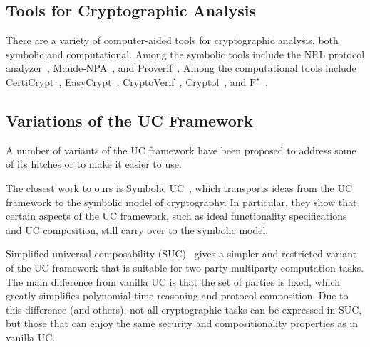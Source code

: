 \subsection{Tools for Cryptographic Analysis}
\label{subsec:tools}

There are a variety of computer-aided tools for cryptographic analysis, both
symbolic and computational. Among the symbolic tools include the NRL protocol
analyzer~\cite{meadows1996nrl}, Maude-NPA~\cite{escobar2009maude}, and
Proverif~\cite{blanchet2010proverif}. Among the computational tools include
CertiCrypt~\cite{barthe2009formal}, EasyCrypt~\cite{barthe2011computer},
CryptoVerif~\cite{blanchet2007cryptoverif}, Cryptol~\cite{lewis2003cryptol}, and
$\text{F}^{\star}$~\cite{swamy2016dependent}.


\subsection{Variations of the UC Framework}
\label{subsec:uc-variants}

A number of variants of the UC framework have been proposed to address some of
its hitches or to make it easier to use.

The closest work to ours is Symbolic UC~\cite{bohl2016symbolic}, which
transports ideas from the UC framework to the symbolic model of cryptography. In
particular, they show that certain aspects of the UC framework, such as ideal
functionality specifications and UC composition, still carry over to the
symbolic model.

Simplified universal composability (SUC)~\cite{canetti2015simpler} gives a
simpler and restricted variant of the UC framework that is suitable for
two-party multiparty computation tasks. The main difference from vanilla UC is
that the set of parties is fixed, which greatly simplifies polynomial time
reasoning and protocol composition. Due to this difference (and others), not all
cryptographic tasks can be expressed in SUC, but those that can enjoy the same
security and compositionality properties as in vanilla UC.

